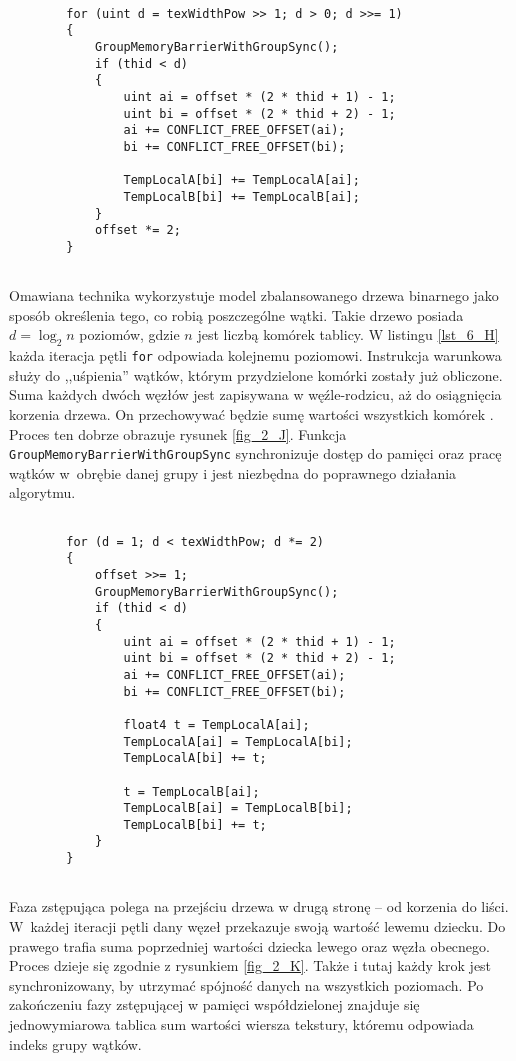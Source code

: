 		\begin{lstlisting}[language=HLSL,caption={Obliczenie sum prefiksów w algorytmie tworzenia SAT (faza wstępująca).},label={lst_6_H}]
	
		for (uint d = texWidthPow >> 1; d > 0; d >>= 1)
		{
			GroupMemoryBarrierWithGroupSync();
			if (thid < d)
			{
				uint ai = offset * (2 * thid + 1) - 1;
				uint bi = offset * (2 * thid + 2) - 1;
				ai += CONFLICT_FREE_OFFSET(ai);
				bi += CONFLICT_FREE_OFFSET(bi);
				
				TempLocalA[bi] += TempLocalA[ai];
				TempLocalB[bi] += TempLocalB[ai];
			}
			offset *= 2;
		}
		
		\end{lstlisting}
		
		Omawiana technika wykorzystuje model zbalansowanego drzewa binarnego jako sposób określenia tego, co robią poszczególne wątki. Takie drzewo posiada \(d = \log_{2}n\) poziomów, gdzie \(n\) jest liczbą komórek tablicy. W listingu \ref{lst_6_H} każda iteracja pętli \texttt{for} odpowiada kolejnemu poziomowi. Instrukcja warunkowa służy do ,,uśpienia'' wątków, którym przydzielone komórki zostały już obliczone. Suma każdych dwóch węzłów jest zapisywana w węźle-rodzicu, aż do osiągnięcia korzenia drzewa. On przechowywać będzie sumę wartości wszystkich komórek \cite{sat}. Proces ten dobrze obrazuje rysunek \ref{fig_2_J}. Funkcja \texttt{GroupMemoryBarrierWithGroupSync} synchronizuje dostęp do pamięci oraz pracę wątków w~obrębie danej grupy i jest niezbędna do poprawnego działania algorytmu.
		
		\begin{lstlisting}[language=HLSL,caption={Obliczenie sum końcowych w algorytmie tworzenia SAT (faza zstępująca).},label={lst_6_I}]
		
		for (d = 1; d < texWidthPow; d *= 2)
		{
			offset >>= 1;
			GroupMemoryBarrierWithGroupSync();
			if (thid < d)
			{
				uint ai = offset * (2 * thid + 1) - 1;
				uint bi = offset * (2 * thid + 2) - 1;
				ai += CONFLICT_FREE_OFFSET(ai);
				bi += CONFLICT_FREE_OFFSET(bi);
				
				float4 t = TempLocalA[ai];
				TempLocalA[ai] = TempLocalA[bi];
				TempLocalA[bi] += t;
				
				t = TempLocalB[ai];
				TempLocalB[ai] = TempLocalB[bi];
				TempLocalB[bi] += t;
			}
		}
		
		\end{lstlisting}
		
		Faza zstępująca polega na przejściu drzewa w drugą stronę -- od korzenia do liści. W~każdej iteracji pętli dany węzeł przekazuje swoją wartość lewemu dziecku. Do prawego trafia suma poprzedniej wartości dziecka lewego oraz węzła obecnego. Proces dzieje się zgodnie z rysunkiem \ref{fig_2_K}. Także i tutaj każdy krok jest synchronizowany, by utrzymać spójność danych na wszystkich poziomach. Po zakończeniu fazy zstępującej w pamięci współdzielonej znajduje się jednowymiarowa tablica sum wartości wiersza tekstury, któremu odpowiada indeks grupy wątków.
	
